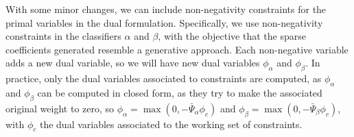 With some minor changes, we can include non-negativity constraints for the primal variables in the dual formulation. Specifically, we use non-negativity constraints in the classifiers $\alpha$ and $\beta$, with the objective that the sparse coefficients generated resemble a generative approach. Each non-negative variable adds a new dual variable, so we will have new dual variables $\phi_\alpha$ and $\phi_\beta$. In practice, only the dual variables associated to constraints are computed, as $\phi_\alpha$ and $\phi_\beta$ can be computed in closed form, as they try to make the associated original weight to zero, so $\phi_\alpha = \max(0,-\bar\Psi_\alpha \phi_c)$ and $\phi_\beta = \max(0,-\bar\Psi_\beta \phi_c)$, with $\phi_c$ the dual variables associated to the working set of constraints.  



